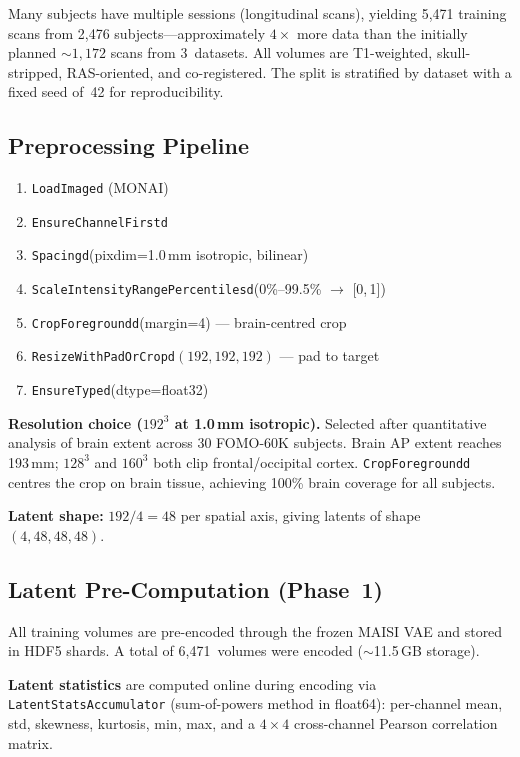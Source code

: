 \documentclass[11pt,a4paper]{article}
\newcommand{\code}[1]{\texttt{#1}}
\begin{document}
Many subjects have multiple sessions (longitudinal scans), yielding 5,471
training scans from 2,476 subjects---approximately $4\times$ more data than
the initially planned ${\sim}1{,}172$ scans from 3~datasets.  All volumes are
T1-weighted, skull-stripped, RAS-oriented, and co-registered.  The split is
stratified by dataset with a fixed seed of~42 for reproducibility.

\subsection{Preprocessing Pipeline}

\begin{enumerate}[nosep]
  \item \code{LoadImaged} (MONAI)
  \item \code{EnsureChannelFirstd}
  \item \code{Spacingd}(pixdim=1.0\,mm isotropic, bilinear)
  \item \code{ScaleIntensityRangePercentilesd}(0\%--99.5\% $\to$ [0,\,1])
  \item \code{CropForegroundd}(margin=4) --- brain-centred crop
  \item \code{ResizeWithPadOrCropd}$(192,192,192)$ --- pad to target
  \item \code{EnsureTyped}(dtype=float32)
\end{enumerate}

\textbf{Resolution choice ($192^3$ at 1.0\,mm isotropic).}  Selected after
quantitative analysis of brain extent across 30 FOMO-60K subjects.  Brain AP
extent reaches 193\,mm; $128^3$ and $160^3$ both clip frontal/occipital
cortex.  \code{CropForegroundd} centres the crop on brain tissue, achieving
100\% brain coverage for all subjects.

\textbf{Latent shape:} $192/4 = 48$ per spatial axis, giving latents of shape
$(4,48,48,48)$.

\subsection{Latent Pre-Computation (Phase~1)}

All training volumes are pre-encoded through the frozen MAISI VAE and stored
in HDF5 shards.  A total of 6,471~volumes were encoded (${\sim}$11.5\,GB
storage).

\textbf{Latent statistics} are computed online during encoding via
\code{LatentStatsAccumulator} (sum-of-powers method in float64): per-channel
mean, std, skewness, kurtosis, min, max, and a $4{\times}4$ cross-channel
Pearson correlation matrix.
\end{document}
